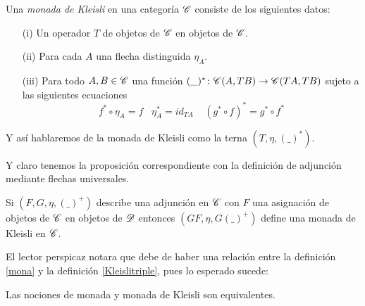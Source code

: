 \documentclass{comunicaciones}
\begin{document}
\begin{dfn}\label{Kleislitriple}
Una \emph{monada de Kleisli} en una categoría $\mathscr C$ consiste de los siguientes datos:\begin{itemize}
\item[(i)] Un operador $T$ de objetos de $\mathscr C$ en objetos de $\mathscr C$.
\item[(ii)] Para cada $A$ una flecha distinguida $\eta_{A}$.
\item[(iii)] Para todo $A,B\in\mathscr C$ una función $(\_)^{*}\colon\mathscr C(A,TB)\rightarrow\mathscr C(TA,TB)$ sujeto a las siguientes ecuaciones \[f^{*}\circ\eta_{A}=f\;\;\; \eta_{A}^{*}=id_{TA}\;\;\;\; (g^{*}\circ f)^{*}=g^{*}\circ f^{*}\]  

\end{itemize}
Y así hablaremos de la monada de Kleisli como la terna $(T,\eta,(\_)^{*})$.
\end{dfn}
Y claro tenemos la proposición correspondiente con la definición de adjunción mediante flechas universales.
\begin{prop}\label{Kleisiarrow}
Si $(F,G,\eta,(\_)^{+})$ describe una adjunción en $\mathscr C$ con $F$ una asignación de objetos de $\mathscr C$ en objetos de $\mathscr D$ entonces $(GF,\eta,G(\_)^{+})$ define una monada de Kleisli en $\mathscr C$. 
\end{prop}    
El lector perspicaz notara que debe de haber una relación entre la definición \ref{mona} y la definición \ref{Kleislitriple}, pues lo esperado sucede:

\begin{prop}\label{expected}
Las nociones de monada y monada de Kleisli son equivalentes.
\end{prop}    
\end{document}

